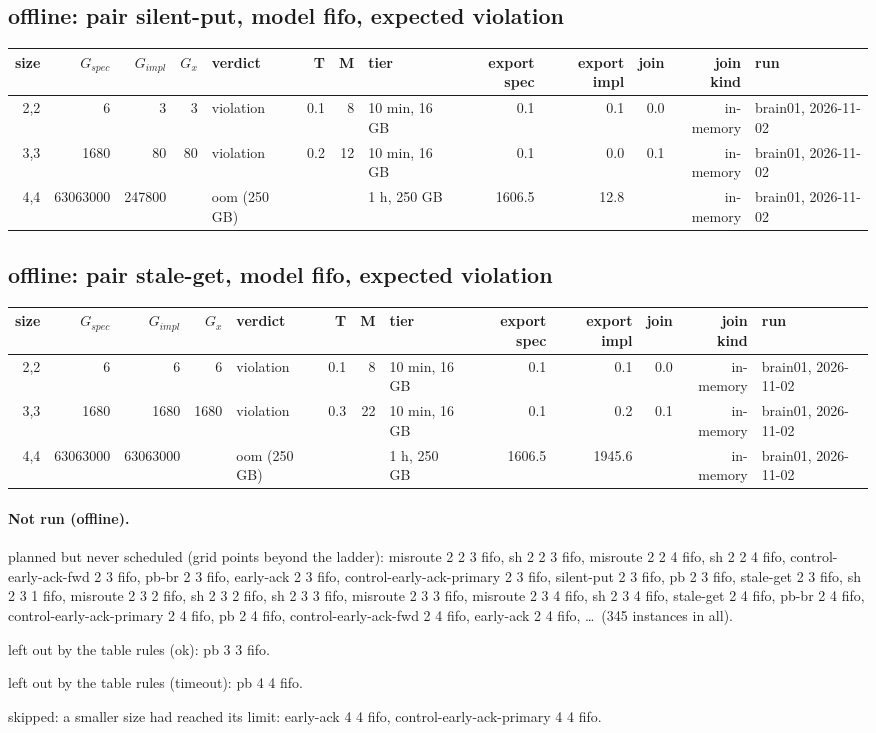 \documentclass[10pt]{article}
\begin{document}
\subsection*{offline: pair \textsf{silent-put}, model fifo, expected violation}
\begin{longtable}{@{}rrrrlrrlrrrrl@{}}
\toprule
size & $G_{\mathit{spec}}$ & $G_{\mathit{impl}}$ & $G_x$ & verdict & T & M & tier & export spec & export impl & join & join kind & run \\
\midrule
\endhead
\color{red} 2,2 & 6 & 3 & 3 & violation & 0.1 & 8 & 10 min, 16 GB & 0.1 & 0.1 & 0.0 & in-memory & brain01, 2026-11-02 \\
\color{red} 3,3 & 1680 & 80 & 80 & violation & 0.2 & 12 & 10 min, 16 GB & 0.1 & 0.0 & 0.1 & in-memory & brain01, 2026-11-02 \\
\color{red} 4,4 & 63063000 & 247800 &  & oom (250 GB) &  &  & 1 h, 250 GB & 1606.5 & 12.8 &  & in-memory & brain01, 2026-11-02 \\
\bottomrule
\end{longtable}
\subsection*{offline: pair \textsf{stale-get}, model fifo, expected violation}
\begin{longtable}{@{}rrrrlrrlrrrrl@{}}
\toprule
size & $G_{\mathit{spec}}$ & $G_{\mathit{impl}}$ & $G_x$ & verdict & T & M & tier & export spec & export impl & join & join kind & run \\
\midrule
\endhead
\color{red} 2,2 & 6 & 6 & 6 & violation & 0.1 & 8 & 10 min, 16 GB & 0.1 & 0.1 & 0.0 & in-memory & brain01, 2026-11-02 \\
\color{red} 3,3 & 1680 & 1680 & 1680 & violation & 0.3 & 22 & 10 min, 16 GB & 0.1 & 0.2 & 0.1 & in-memory & brain01, 2026-11-02 \\
\color{red} 4,4 & 63063000 & 63063000 &  & oom (250 GB) &  &  & 1 h, 250 GB & 1606.5 & 1945.6 &  & in-memory & brain01, 2026-11-02 \\
\bottomrule
\end{longtable}
\paragraph{Not run (offline).}
planned but never scheduled (grid points beyond the ladder): misroute 2 2 3 fifo, sh 2 2 3 fifo, misroute 2 2 4 fifo, sh 2 2 4 fifo, control-early-ack-fwd 2 3 fifo, pb-br 2 3 fifo, early-ack 2 3 fifo, control-early-ack-primary 2 3 fifo, silent-put 2 3 fifo, pb 2 3 fifo, stale-get 2 3 fifo, sh 2 3 1 fifo, misroute 2 3 2 fifo, sh 2 3 2 fifo, sh 2 3 3 fifo, misroute 2 3 3 fifo, misroute 2 3 4 fifo, sh 2 3 4 fifo, stale-get 2 4 fifo, pb-br 2 4 fifo, control-early-ack-primary 2 4 fifo, pb 2 4 fifo, control-early-ack-fwd 2 4 fifo, early-ack 2 4 fifo, \ldots\ (345 instances in all).\par
left out by the table rules (ok): pb 3 3 fifo.\par
left out by the table rules (timeout): pb 4 4 fifo.\par
skipped: a smaller size had reached its limit: early-ack 4 4 fifo, control-early-ack-primary 4 4 fifo.\par
\end{document}
